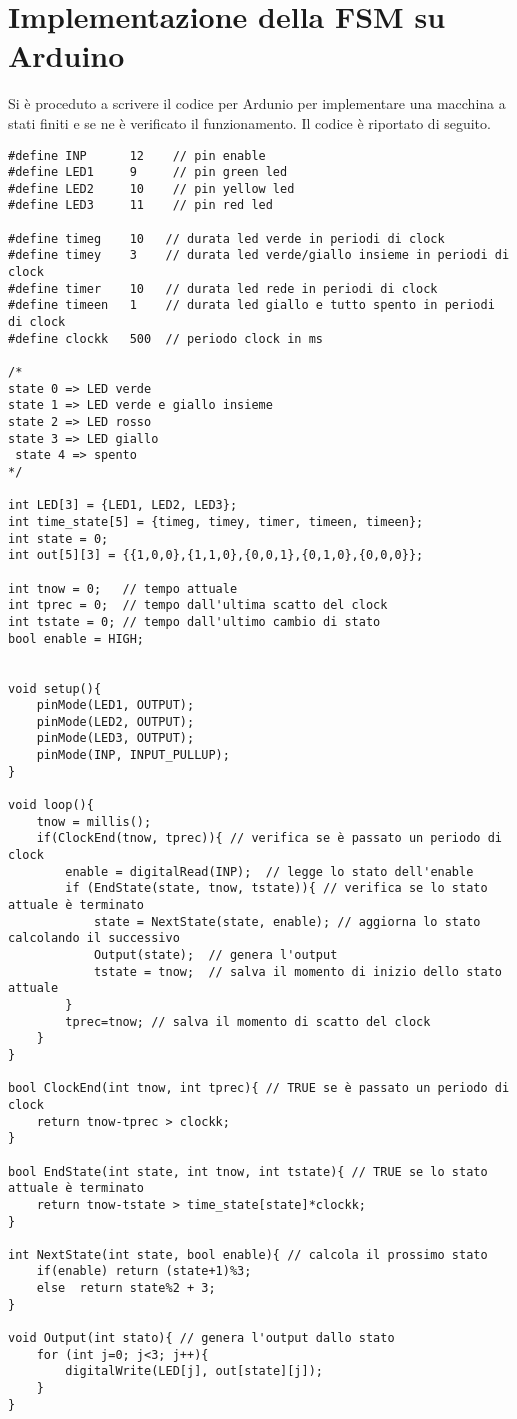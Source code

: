 \section{Implementazione della FSM su Arduino}

Si è proceduto a scrivere il codice per Ardunio per implementare una macchina a stati finiti e se ne è verificato il funzionamento.
Il codice è riportato di seguito.

\begin{verbatim}
#define INP      12    // pin enable
#define LED1     9     // pin green led  
#define LED2     10    // pin yellow led
#define LED3     11    // pin red led

#define timeg    10   // durata led verde in periodi di clock
#define timey    3    // durata led verde/giallo insieme in periodi di clock
#define timer    10   // durata led rede in periodi di clock
#define timeen   1    // durata led giallo e tutto spento in periodi di clock
#define clockk   500  // periodo clock in ms

/*
state 0 => LED verde
state 1 => LED verde e giallo insieme
state 2 => LED rosso
state 3 => LED giallo
 state 4 => spento
*/

int LED[3] = {LED1, LED2, LED3};
int time_state[5] = {timeg, timey, timer, timeen, timeen};
int state = 0;
int out[5][3] = {{1,0,0},{1,1,0},{0,0,1},{0,1,0},{0,0,0}};

int tnow = 0;   // tempo attuale
int tprec = 0;  // tempo dall'ultima scatto del clock
int tstate = 0; // tempo dall'ultimo cambio di stato
bool enable = HIGH;


void setup(){
	pinMode(LED1, OUTPUT);
	pinMode(LED2, OUTPUT);
	pinMode(LED3, OUTPUT);
	pinMode(INP, INPUT_PULLUP);
}

void loop(){
	tnow = millis();
	if(ClockEnd(tnow, tprec)){ // verifica se è passato un periodo di clock
		enable = digitalRead(INP);  // legge lo stato dell'enable
		if (EndState(state, tnow, tstate)){ // verifica se lo stato attuale è terminato
			state = NextState(state, enable); // aggiorna lo stato calcolando il successivo
			Output(state);  // genera l'output
			tstate = tnow;  // salva il momento di inizio dello stato attuale
		}
		tprec=tnow; // salva il momento di scatto del clock
	}
}

bool ClockEnd(int tnow, int tprec){ // TRUE se è passato un periodo di clock
	return tnow-tprec > clockk;
}

bool EndState(int state, int tnow, int tstate){ // TRUE se lo stato attuale è terminato
	return tnow-tstate > time_state[state]*clockk;
}

int NextState(int state, bool enable){ // calcola il prossimo stato 
	if(enable) return (state+1)%3;
	else  return state%2 + 3;
}

void Output(int stato){ // genera l'output dallo stato
	for (int j=0; j<3; j++){
		digitalWrite(LED[j], out[state][j]);
	}
}	
\end{verbatim}